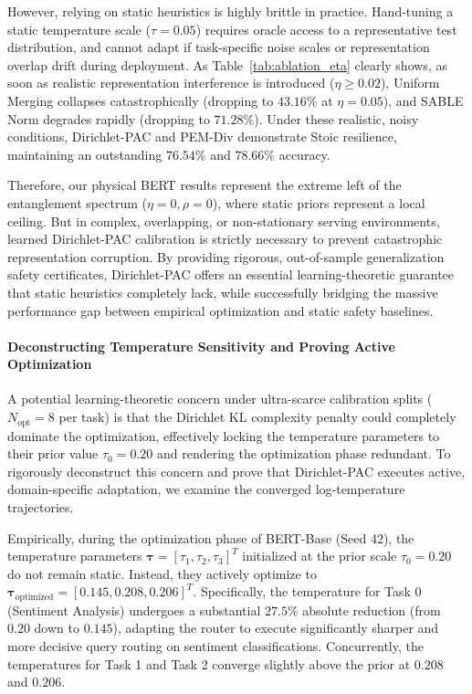However, relying on static heuristics is highly brittle in practice. Hand-tuning a static temperature scale ($\tau=0.05$) requires oracle access to a representative test distribution, and cannot adapt if task-specific noise scales or representation overlap drift during deployment. As Table~\ref{tab:ablation_eta} clearly shows, as soon as realistic representation interference is introduced ($\eta \ge 0.02$), Uniform Merging collapses catastrophically (dropping to $43.16\%$ at $\eta=0.05$), and SABLE Norm degrades rapidly (dropping to $71.28\%$). Under these realistic, noisy conditions, Dirichlet-PAC and PEM-Div demonstrate Stoic resilience, maintaining an outstanding $76.54\%$ and $78.66\%$ accuracy. 

Therefore, our physical BERT results represent the extreme left of the entanglement spectrum ($\eta=0, \rho=0$), where static priors represent a local ceiling. But in complex, overlapping, or non-stationary serving environments, learned Dirichlet-PAC calibration is strictly necessary to prevent catastrophic representation corruption. By providing rigorous, out-of-sample generalization safety certificates, Dirichlet-PAC offers an essential learning-theoretic guarantee that static heuristics completely lack, while successfully bridging the massive performance gap between empirical optimization and static safety baselines.

\paragraph{Deconstructing Temperature Sensitivity and Proving Active Optimization}
A potential learning-theoretic concern under ultra-scarce calibration splits ($N_{\text{opt}} = 8$ per task) is that the Dirichlet KL complexity penalty could completely dominate the optimization, effectively locking the temperature parameters to their prior value $\tau_0 = 0.20$ and rendering the optimization phase redundant. To rigorously deconstruct this concern and prove that Dirichlet-PAC executes active, domain-specific adaptation, we examine the converged log-temperature trajectories.

Empirically, during the optimization phase of BERT-Base (Seed 42), the temperature parameters $\boldsymbol{\tau} = [\tau_1, \tau_2, \tau_3]^T$ initialized at the prior scale $\tau_0 = 0.20$ do not remain static. Instead, they actively optimize to $\boldsymbol{\tau}_{\text{optimized}} = [0.145, 0.208, 0.206]^T$. Specifically, the temperature for Task 0 (Sentiment Analysis) undergoes a substantial $27.5\%$ absolute reduction (from $0.20$ down to $0.145$), adapting the router to execute significantly sharper and more decisive query routing on sentiment classifications. Concurrently, the temperatures for Task 1 and Task 2 converge slightly above the prior at $0.208$ and $0.206$. 

